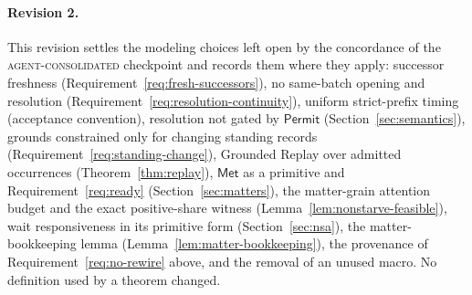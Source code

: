 \documentclass[11pt]{article}
\theoremstyle{definition}
\theoremstyle{remark}
\newcommand{\Permit}{\mathsf{Permit}}
\newcommand{\Met}{\mathsf{Met}}
\begin{document}
\paragraph{Revision 2.}
This revision settles the modeling choices left open by the concordance of the
\textsc{agent-consolidated} checkpoint and records them where they apply:
successor freshness (Requirement~\ref{req:fresh-successors}), no same-batch
opening and resolution (Requirement~\ref{req:resolution-continuity}), uniform
strict-prefix timing (acceptance convention), resolution not gated by
$\Permit$ (Section~\ref{sec:semantics}), grounds constrained only for changing
standing records (Requirement~\ref{req:standing-change}), Grounded Replay over
admitted occurrences (Theorem~\ref{thm:replay}), $\Met$ as a primitive and
Requirement~\ref{req:ready} (Section~\ref{sec:matters}), the matter-grain
attention budget and the exact positive-share witness
(Lemma~\ref{lem:nonstarve-feasible}), wait responsiveness in its primitive form
(Section~\ref{sec:nsa}), the matter-bookkeeping lemma
(Lemma~\ref{lem:matter-bookkeeping}), the provenance of
Requirement~\ref{req:no-rewire} above, and the removal of an unused macro. No
definition used by a theorem changed.
\end{document}
